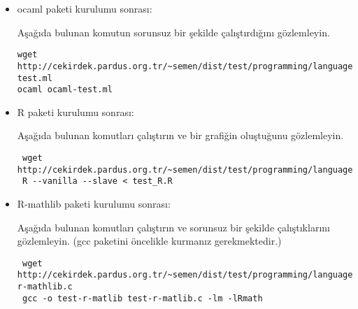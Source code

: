 \documentclass[a4paper,10pt]{article}
\begin{document}
\begin{itemize}
\item ocaml paketi kurulumu sonrası:

Aşağıda bulunan komutun sorunsuz bir şekilde çalıştırdığını gözlemleyin.
\begin{verbatim}
wget http://cekirdek.pardus.org.tr/~semen/dist/test/programming/language/ocaml-test.ml 
ocaml ocaml-test.ml
\end{verbatim}

 \item R paketi kurulumu sonrası:

Aşağıda bulunan komutları çalıştırın ve bir grafiğin oluştuğunu gözlemleyin.
\begin{verbatim}
 wget http://cekirdek.pardus.org.tr/~semen/dist/test/programming/language/test_R.R
 R --vanilla --slave < test_R.R
\end{verbatim}
\item R-mathlib paketi kurulumu sonrası:

Aşağıda bulunan komutları çalıştırın ve sorunsuz bir şekilde çalıştıklarını gözlemleyin. (gcc paketini öncelikle kurmanız gerekmektedir.)	
\begin{verbatim}
 wget http://cekirdek.pardus.org.tr/~semen/dist/test/programming/language/test-r-mathlib.c
 gcc -o test-r-matlib test-r-matlib.c -lm -lRmath
\end{verbatim}
\end{itemize}
\end{document}
